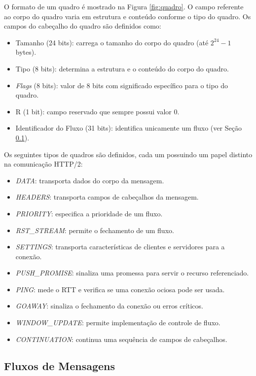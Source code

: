 O formato de um quadro é mostrado na Figura \ref{fig:quadro}. O campo referente ao corpo do quadro varia em estrutura e conteúdo conforme o tipo do quadro. Os campos do cabeçalho do quadro são definidos como:

\begin{itemize}
    \item Tamanho (24 bits): carrega o tamanho do corpo do quadro (até $2^{24} - 1$ bytes).
    \item Tipo (8 bits): determina a estrutura e o conteúdo do corpo do quadro.
    \item {\em Flags} (8 bits): valor de 8 bits com significado específico para o tipo do quadro.
    \item R (1 bit): campo reservado que sempre possui valor 0.
    \item Identificador do Fluxo (31 bits): identifica unicamente um fluxo (ver Seção \ref{subsec:fluxos}).
\end{itemize}

Os seguintes tipos de quadros são definidos, cada um possuindo um papel distinto na comunicação HTTP/2:

\begin{itemize}
    \item {\em DATA}: transporta dados do corpo da mensagem.
    \item {\em HEADERS}: transporta campos de cabeçalhos da mensagem.
    \item {\em PRIORITY}: especifica a prioridade de um fluxo.
    \item {\em RST\_STREAM}: permite o fechamento de um fluxo.
    \item {\em SETTINGS}: transporta características de clientes e servidores para a conexão.
    \item {\em PUSH\_PROMISE}: sinaliza uma promessa para servir o recurso referenciado.
    \item {\em PING}: mede o RTT e verifica se uma conexão ociosa pode ser usada.
    \item {\em GOAWAY}: sinaliza o fechamento da conexão ou erros críticos.
    \item {\em WINDOW\_UPDATE}: permite implementação de controle de fluxo.
    \item {\em CONTINUATION}: continua uma sequência de campos de cabeçalhos.
\end{itemize}

\subsection{Fluxos de Mensagens}
\label{subsec:fluxos}

